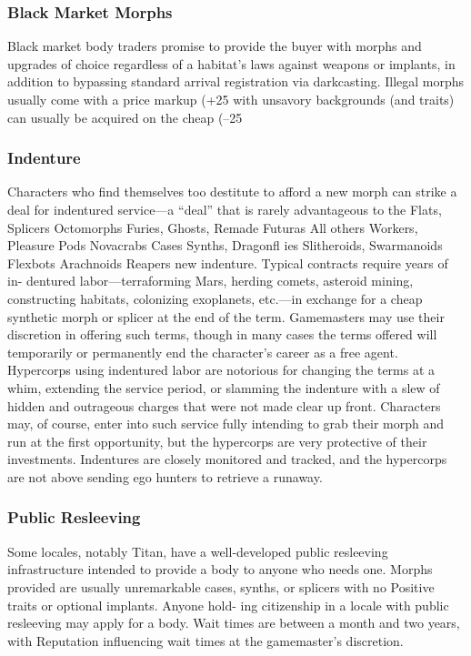 \subsubsection{Black Market Morphs}

Black market body traders promise to provide the 
buyer with morphs and upgrades of choice regardless 
of a habitat's laws against weapons or implants, in 
addition to bypassing standard arrival registration 
via darkcasting. Illegal morphs usually come with a 
price markup (+25%
with unsavory backgrounds (and traits) can usually be 
acquired on the cheap (–25%

\subsubsection{Indenture}

Characters who find themselves too destitute to 
afford a new morph can strike a deal for indentured 
service—a ``deal'' that is rarely advantageous to the 
Flats, Splicers
Octomorphs
Furies, Ghosts, Remade
Futuras
All others
Workers, Pleasure Pods
Novacrabs
Cases
Synths, Dragonﬂ ies
Slitheroids, Swarmanoids
Flexbots
Arachnoids
Reapers
new indenture. Typical contracts require years of in-
dentured labor—terraforming Mars, herding comets, 
asteroid mining, constructing habitats, colonizing 
exoplanets, etc.—in exchange for a cheap synthetic 
morph or splicer at the end of the term. Gamemasters 
may use their discretion in offering such terms, though 
in many cases the terms offered will temporarily or 
permanently end the character's career as a free agent. 
Hypercorps using indentured labor are notorious for 
changing the terms at a whim, extending the service 
period, or slamming the indenture with a slew of 
hidden and outrageous charges that were not made 
clear up front. Characters may, of course, enter into 
such service fully intending to grab their morph and 
run at the first opportunity, but the hypercorps are 
very protective of their investments. Indentures are 
closely monitored and tracked, and the hypercorps are 
not above sending ego hunters to retrieve a runaway.

\subsubsection{Public Resleeving}

Some locales, notably Titan, have a well-developed 
public resleeving infrastructure intended to provide a 
body to anyone who needs one. Morphs provided are 
usually unremarkable cases, synths, or splicers with 
no Positive traits or optional implants. Anyone hold-
ing citizenship in a locale with public resleeving may 
apply for a body. Wait times are between a month and 
two years, with Reputation influencing wait times at 
the gamemaster's discretion.

